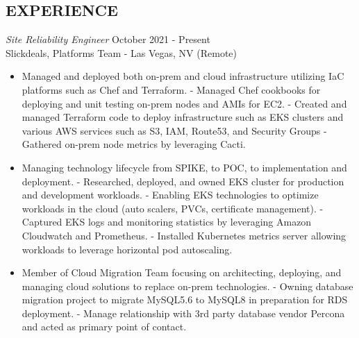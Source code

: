 \documentclass[line,margin]{res}
\begin{document}
\address{Phone: +1.650.772.1711 $|$ Email: alan.huang.250r@gmail.com}

\begin{resume}


\section{EXPERIENCE}
\vspace{25px}
\begin{adjustwidth}{-115pt}{0pt}
	{\sl Site Reliability Engineer}
		\hfill October 2021 - Present\\
		Slickdeals, Platforms Team - Las Vegas, NV (Remote)
		\begin{itemize}
			\item Managed and deployed both on-prem and cloud infrastructure utilizing IaC platforms such as Chef and Terraform.
				\subitem - Managed Chef cookbooks for deploying and unit testing on-prem nodes and AMIs for EC2.
				\subitem - Created and managed Terraform code to deploy infrastructure such as EKS clusters and various AWS services such as S3, IAM, Route53, and Security Groups
				\subitem - Gathered on-prem node metrics by leveraging Cacti.
			\item Managing technology lifecycle from SPIKE, to POC, to implementation and deployment.
				\subitem - Researched, deployed, and owned EKS cluster for production and development workloads.
				\subitem - Enabling EKS technologies to optimize workloads in the cloud (auto scalers, PVCs, certificate management).
				\subitem - Captured EKS logs and monitoring statistics by leveraging Amazon Cloudwatch and Prometheus.
				\subitem - Installed Kubernetes metrics server allowing workloads to leverage horizontal pod autoscaling.
			\item Member of Cloud Migration Team focusing on architecting, deploying, and managing cloud solutions to replace on-prem technologies.
				\subitem - Owning database migration project to migrate MySQL5.6 to MySQL8 in preparation for RDS deployment.
				\subitem - Manage relationship with 3rd party database vendor Percona and acted as primary point of contact.


\end{itemize}
\end{adjustwidth}
\end{resume}
\end{document}
